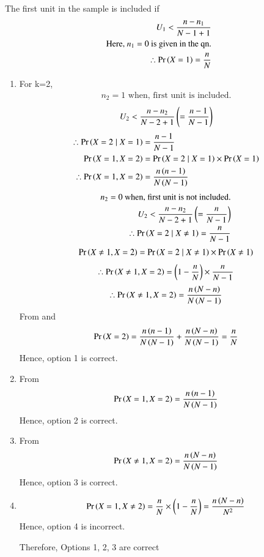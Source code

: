 \documentclass[journal,12pt,twocolumn]{IEEEtran}
\begin{document}
The first unit in the sample is included if
\begin{align}
    U_1 < \frac{n-n_1}{N-1+1}  
    \\\text{Here, } n_1=0 \text{ is given in the qn.}
    \\\therefore \Pr\left(X=1\right) = \frac{n}{N}
\end{align}
\begin{enumerate}
    \item For k=2, 
\begin{align}
    n_2 = 1 \text{ when, first unit is included.}
\end{align}
\begin{align}
    U_2 < \frac{n-n_2}{N-2+1} \left( = \frac{n-1}{N-1}\right)
\end{align}
\begin{align}
    \therefore \Pr\left(X=2 \mid X=1\right) &= \frac{n-1}{N-1}
    \\\Pr\left(X=1, X=2\right) &= \Pr\left(X=2 \mid X=1\right) \times \Pr\left(X=1\right)
    \\\therefore \Pr\left(X=1, X=2\right) &= \frac{n \left(n-1\right)}{N \left(N-1\right)}
\end{align}
\begin{align}
    n_2 = 0 \text{ when, first unit is not included.}
    \\U_2 < \frac{n-n_2}{N-2+1} \left(= \frac{n}{N-1}\right)
    \\\therefore \Pr\left(X=2 \mid X\neq 1\right) = \frac{n}{N-1}
\end{align}
\begin{align}
    \Pr\left(X\neq1, X=2\right) = \Pr\left(X=2 \mid X\neq1\right) \times \Pr\left(X\neq1\right)
\end{align}
\begin{align}
    \therefore \Pr\left(X\neq1,X=2\right) = \left(1-\frac{n}{N}\right)\times\frac{n}{N-1}
\end{align}
\begin{align}
    \therefore \Pr\left(X\neq1,X=2\right) = \frac{n \left(N-n\right)}{N \left(N-1\right)}
\end{align}
From  and 
\begin{align}
    \Pr\left(X=2\right) = \frac{n \left(n-1\right)}{N \left(N-1\right)} + \frac{n \left(N-n\right)}{N \left(N-1\right)} = \frac{n}{N}
\end{align}
Hence, option 1 is correct.
\item From  
\begin{align}
    \Pr\left(X=1, X=2\right) = \frac{n \left(n-1\right)}{N \left(N-1\right)}
\end{align}
Hence, option 2 is correct.
\item From  
\begin{align}
    \Pr\left(X\neq1,X=2\right) = \frac{n \left(N-n\right)}{N \left(N-1\right)}
\end{align}
Hence, option 3 is correct.
\item 
\begin{align}
\Pr\left(X=1, X\neq2\right) = \frac{n}{N} \times \left(1-\frac{n}{N}\right) = \frac{n \left(N-n\right)}{N^2}
\end{align}
Hence, option 4 is incorrect.

Therefore, Options 1, 2, 3 are correct
\end{enumerate}
\end{document}
